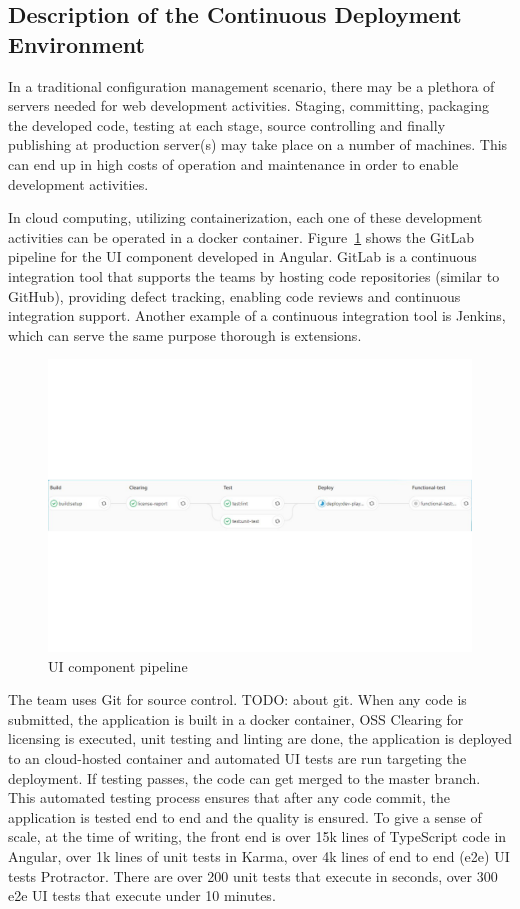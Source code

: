 \documentclass[conference]{IEEEtran}
\newcommand{\todo}[1]{}
\renewcommand{\todo}[1]{{\color{red} TODO: {#1}}}
\begin{document}
	\subsection{Description of the Continuous Deployment Environment }
	In a traditional configuration management scenario, there may be a plethora of servers needed for web development activities.
	Staging, committing, packaging the developed code, testing at each stage, source controlling and finally publishing at production server(s) may take place on a number of machines.
	This can end up in high costs of operation and maintenance in order to enable development activities.

	In cloud computing, utilizing containerization, each one of these development activities can be operated in a docker container.
	Figure~\ref{fig:UIpipeline} shows the GitLab pipeline for the UI component developed in Angular.
	GitLab is a continuous integration tool that supports the teams by hosting code repositories (similar to GitHub), providing defect tracking, enabling code reviews and continuous integration support. 
	Another example of a continuous integration tool is Jenkins, which can serve the same purpose thorough is extensions.

	\begin{figure}[!ht]
		\centering
			\includegraphics[width=1.00\textwidth]{UIpipeline.pdf}
		\caption{UI component pipeline}
		\label{fig:UIpipeline}
	\end{figure}
	

	The team uses Git for source control. \todo{about git}. 
	When any code is submitted, the application is built in a docker container, OSS Clearing for licensing is executed, unit testing and linting are done, the application is deployed to an cloud-hosted container and automated UI tests are run targeting the deployment.
	If testing passes, the code can get merged to the master branch. 
	This automated testing process ensures that after any code commit, the application is tested end to end and the quality is ensured. 
	To give a sense of scale, at the time of writing, the front end is over 15k lines of TypeScript code in Angular, over 1k lines of unit tests in Karma, over 4k lines of end to end (e2e) UI tests Protractor. 
	There are over 200 unit tests that execute in seconds, over 300 e2e UI tests that execute under 10 minutes. 
\end{document}
